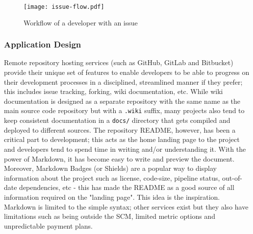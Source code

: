 \documentclass[../mpaper.tex]{subfiles}
\begin{document}
\begin{figure*}
    \centering
    \texttt{[image: issue-flow.pdf]}
    \caption{Workflow of a developer with an issue}
    \label{fig:issue-flow}
\end{figure*}



\subsubsection*{Application Design}

Remote repository hosting services (such as GitHub, GitLab and Bitbucket) provide their unique set of features to enable developers to be able to progress on their development processes in a disciplined, streamlined manner if they prefer; this includes issue tracking, forking, wiki documentation, etc. While wiki documentation is designed as a separate repository with the same name as the main source code repository but with a \texttt{.wiki} suffix, many projects also tend to keep consistent documentation in a \texttt{docs/} directory that gets compiled and deployed to different sources. The repository README, however, has been a critical part to development; this acts as the home landing page to the project and developers tend to spend time in writing and/or understanding it. With the power of Markdown, it has become easy to write and preview the document. Moreover, Markdown Badges (or Shields) are a popular way to display information about the project such as license, code-size, pipeline status, out-of-date dependencies, etc \cite{trockmanAddingSparkleSocial2018} - this has made the README as a good source of all information required on the "landing page". This idea is the inspiration. Markdown is limited to the simple syntax; other services exist but they also have limitations such as being outside the SCM, limited metric options and unpredictable payment plans.
\end{document}
